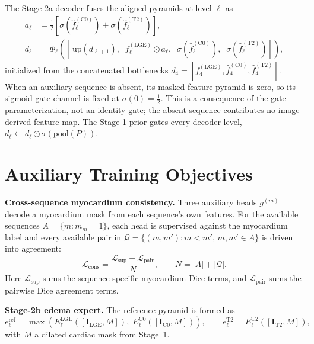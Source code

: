 \documentclass[runningheads]{llncs}
\newcommand{\LGE}{\mathrm{LGE}}
\newcommand{\Cz}{\mathrm{C0}}
\newcommand{\TT}{\mathrm{T2}}
\newcommand{\Img}{\mathbf{I}}
\begin{document}
The Stage-2a decoder fuses the aligned pyramids at level $\ell$ as
\begin{align}
a_\ell &= \tfrac{1}{2}\left[\sigma\!\left(\hat{f}^{(\Cz)}_\ell\right) + \sigma\!\left(\hat{f}^{(\TT)}_\ell\right)\right],\\
d_\ell &= \Phi_\ell\!\left(\left[\,\mathrm{up}(d_{\ell+1}),\;\; f^{(\LGE)}_\ell\odot a_\ell,\;\; \sigma\!\left(\hat{f}^{(\Cz)}_\ell\right),\;\; \sigma\!\left(\hat{f}^{(\TT)}_\ell\right)\right]\right),
\end{align}
initialized from the concatenated bottlenecks
$d_4=[f^{(\LGE)}_4,\hat{f}^{(\Cz)}_4,\hat{f}^{(\TT)}_4]$. When an auxiliary
sequence is absent, its masked feature pyramid is zero, so its sigmoid gate
channel is fixed at $\sigma(0)=\tfrac12$. This is a consequence of the gate
parameterization, not an identity gate; the absent sequence contributes no
image-derived feature map. The Stage-1 prior gates every decoder level,
$d_\ell \leftarrow d_\ell\odot\sigma(\mathrm{pool}(P))$.

\section{Auxiliary Training Objectives}
\label{app:losses}

\noindent\textbf{Cross-sequence myocardium consistency.} Three auxiliary heads
$g^{(m)}$ decode a myocardium mask from each sequence's own features. For the
available sequences $A=\{m:m_m=1\}$, each head is supervised against the
myocardium label and every available pair in
$\mathcal{Q}=\{(m,m'):m<m',\,m,m'\in A\}$ is driven into agreement:
\begin{equation}
\mathcal{L}_{\text{cons}}=\frac{\mathcal{L}_{\text{sup}}+
\mathcal{L}_{\text{pair}}}{N},\qquad N=|A|+|\mathcal{Q}|.
\end{equation}
Here $\mathcal{L}_{\text{sup}}$ sums the sequence-specific myocardium Dice
terms, and $\mathcal{L}_{\text{pair}}$ sums the pairwise Dice agreement terms.

\noindent\textbf{Stage-2b edema expert.} The reference pyramid is formed as
\begin{equation}
e^{\text{ref}}_\ell=\max\!\left(E^{\LGE}_\ell([\Img_\LGE,M]),\;E^{\Cz}_\ell([\Img_\Cz,M])\right),
\qquad
e^{\TT}_\ell=E^{\TT}_\ell([\Img_\TT,M]),
\end{equation}
with $M$ a dilated cardiac mask from Stage~1.
\end{document}
